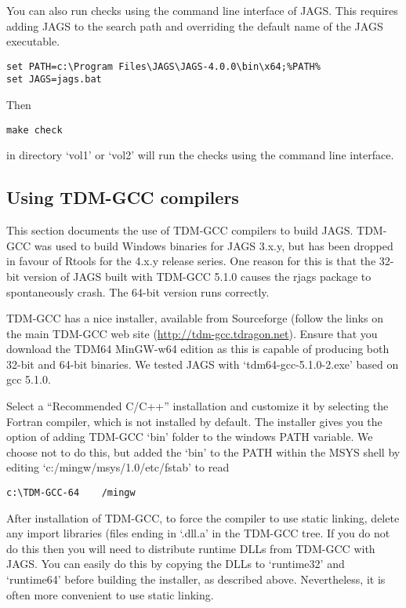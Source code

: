 \documentclass[11pt, a4paper, titlepage]{article}
\newcommand{\JAGS}{\textsf{JAGS}}
\newcommand{\file}[1]{{`\normalfont\textsf{#1}'}}
\begin{document}
You can also run checks using the command line interface of JAGS. This
requires adding JAGS to the search path and overriding the default name
of the JAGS executable.
\begin{verbatim}
set PATH=c:\Program Files\JAGS\JAGS-4.0.0\bin\x64;%PATH%
set JAGS=jags.bat
\end{verbatim}
Then
\begin{verbatim}
make check
\end{verbatim}
in directory \file{vol1} or \file{vol2} will run the checks using the
command line interface.

\subsection{Using TDM-GCC compilers}

This section documents the use of TDM-GCC compilers to build JAGS.
TDM-GCC was used to build Windows binaries for JAGS 3.x.y, but has
been dropped in favour of Rtools for the 4.x.y release series. One
reason for this is that the 32-bit version of JAGS built with TDM-GCC
5.1.0 causes the rjags package to spontaneously crash. The 64-bit
version runs correctly.

TDM-GCC has a nice installer, available from Sourceforge (follow the
links on the main TDM-GCC web site
(\url{http://tdm-gcc.tdragon.net}). Ensure that you download the TDM64
MinGW-w64 edition as this is capable of producing both 32-bit and
64-bit binaries. We tested JAGS with \file{tdm64-gcc-5.1.0-2.exe}
based on gcc 5.1.0.

Select a ``Recommended C/C++'' installation and customize it by
selecting the Fortran compiler, which is not installed by default. The
installer gives you the option of adding TDM-GCC \file{bin} folder to
the windows PATH variable. We choose not to do this, but added the
\file{bin} to the PATH within the MSYS shell by editing
\file{c:/mingw/msys/1.0/etc/fstab} to read
\begin{verbatim}
c:\TDM-GCC-64    /mingw
\end{verbatim}
After installation of TDM-GCC, to force the compiler to use static
linking, delete any import libraries (files ending in \file{.dll.a} in
the TDM-GCC tree. If you do not do this then you will need to
distribute runtime DLLs from TDM-GCC with JAGS. You can easily do this
by copying the DLLs to \file{runtime32} and \file{runtime64} before
building the installer, as described above. Nevertheless, it is often
more convenient to use static linking.
\end{document}
